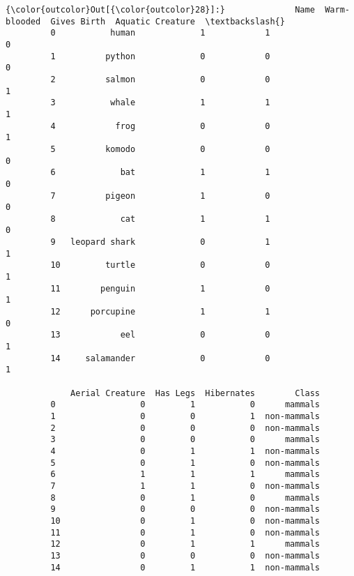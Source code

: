 \documentclass[11pt]{article}
\begin{document}
\begin{Verbatim}[commandchars=\\\{\}]
{\color{outcolor}Out[{\color{outcolor}28}]:}              Name  Warm-blooded  Gives Birth  Aquatic Creature  \textbackslash{}
         0           human             1            1                 0   
         1          python             0            0                 0   
         2          salmon             0            0                 1   
         3           whale             1            1                 1   
         4            frog             0            0                 1   
         5          komodo             0            0                 0   
         6             bat             1            1                 0   
         7          pigeon             1            0                 0   
         8             cat             1            1                 0   
         9   leopard shark             0            1                 1   
         10         turtle             0            0                 1   
         11        penguin             1            0                 1   
         12      porcupine             1            1                 0   
         13            eel             0            0                 1   
         14     salamander             0            0                 1   
         
             Aerial Creature  Has Legs  Hibernates        Class  
         0                 0         1           0      mammals  
         1                 0         0           1  non-mammals  
         2                 0         0           0  non-mammals  
         3                 0         0           0      mammals  
         4                 0         1           1  non-mammals  
         5                 0         1           0  non-mammals  
         6                 1         1           1      mammals  
         7                 1         1           0  non-mammals  
         8                 0         1           0      mammals  
         9                 0         0           0  non-mammals  
         10                0         1           0  non-mammals  
         11                0         1           0  non-mammals  
         12                0         1           1      mammals  
         13                0         0           0  non-mammals  
         14                0         1           1  non-mammals  
\end{Verbatim}
            
\end{document}
